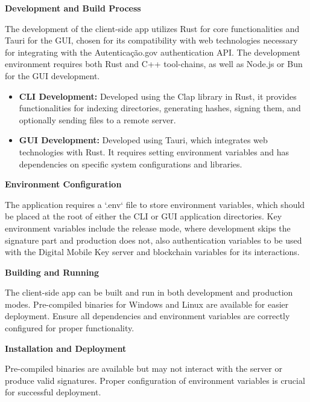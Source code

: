 \documentclass[a4paper,11pt]{article}
\begin{document}
            \vspace{0.25cm}\textbf{Development and Build Process}
            
            The development of the client-side app utilizes Rust for core functionalities and Tauri for the GUI, chosen for its compatibility with web technologies necessary for integrating with the Autenticação.gov authentication API. The development environment requires both Rust and C++ tool-chains, as well as Node.js \cite{NodeJs} or Bun \cite{Bun} for the GUI development.
            
            \begin{itemize}
                \item \textbf{CLI Development:} Developed using the Clap \cite{Clap} library in Rust, it provides functionalities for indexing directories, generating hashes, signing them, and optionally sending files to a remote server.
                \item \textbf{GUI Development:} Developed using Tauri, which integrates web technologies with Rust. It requires setting environment variables and has dependencies on specific system configurations and libraries.
            \end{itemize}
            
            \vspace{0.25cm}\textbf{Environment Configuration}
            
            The application requires a `.env` file to store environment variables, which should be placed at the root of either the CLI or GUI application directories. Key environment variables include the release mode, where development skips the signature part and production does not, also authentication variables to be used with the Digital Mobile Key server and blockchain variables for its interactions.
            
            \vspace{0.25cm}\textbf{Building and Running}
            
            The client-side app can be built and run in both development and production modes. Pre-compiled binaries for Windows and Linux are available for easier deployment. Ensure all dependencies and environment variables are correctly configured for proper functionality.
            
            \vspace{0.25cm}\textbf{Installation and Deployment}
            
            Pre-compiled binaries are available but may not interact with the server or produce valid signatures. Proper configuration of environment variables is crucial for successful deployment.
            
\end{document}
